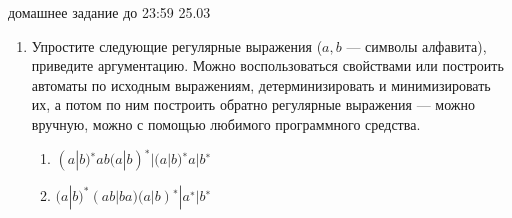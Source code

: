 \documentclass[12pt]{article}
\begin{document}

{\Large домашнее задание до 23:59 25.03}
\bigskip

\begin{enumerate}
  \item 
  { Упростите следующие регулярные выражения ($a, b$ --- символы алфавита), приведите аргументацию. Можно воспользоваться свойствами или построить автоматы по исходным выражениям, детерминизировать и минимизировать их, а потом по ним построить обратно регулярные выражения --- можно вручную, можно с помощью любимого программного средства.  
    \begin{enumerate} 
      \item { $ (a | b)^{∗} ab (a | b)^{∗} | (a | b)^{∗} a | b^{∗} $ }
      \item { $ (a | b)^{*} (ab | ba) (a | b)^{∗} | a^{∗} | b^{∗} $ }
    \end{enumerate}
  }
  

\end{enumerate}
\end{document}
